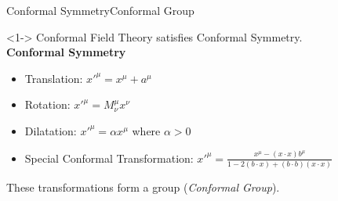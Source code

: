 \documentclass[pdf]{beamer}
\begin{document}
                \begin{frame}[t]{Conformal Symmetry}{Conformal Group}
                    \begin{onlyenv}<1->
                        Conformal Field Theory satisfies Conformal Symmetry.
                        \\[20pt]
                            \textbf{Conformal Symmetry}                       
                        \begin{itemize}
                            \item<3->Translation: $x'^{\mu}  = x^{\mu}+ a^{\mu} $
                            \item<4->Rotation: $x'^{\mu} = M_{\nu}^{\mu} x^{\nu}$
                            \item<5->Dilatation: $x'^{\mu} = \alpha x^{\mu}$ where $\alpha>0$
                            \item<6-> Special Conformal Transformation: $x'^{\mu} = \frac{x^{\mu}-(x\cdot x)b^{\mu}}{1-2(b\cdot x)+(b\cdot b)(x\cdot x)}$
                        \end{itemize}
                        \vspace{10pt}
                            These transformations form a group (\emph{Conformal Group}).
                    \end{onlyenv}
                \end{frame}
\end{document}
